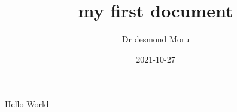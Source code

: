\documentclass{article}
\title{my first document}
\date{2021-10-27}
\author{Dr desmond Moru}
\begin{document}
	\maketitle
	\newpage
	Hello World
\end{document}

